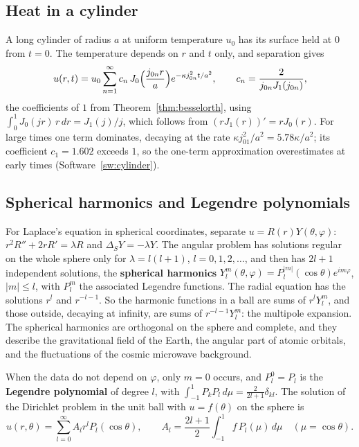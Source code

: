 \documentclass[11pt,a4paper]{article}
\numberwithin{equation}{section}
\theoremstyle{definition}
\begin{document}
\subsection{Heat in a cylinder}
\label{ssec:cylinder}

A long cylinder of radius $a$ at uniform temperature $u_0$ has its surface held at $0$ from $t = 0$. The temperature depends on $r$ and $t$ only, and separation gives
\[
u(r, t) = u_0\sum_{n = 1}^\infty c_n\,J_0\Bigl(\frac{j_{0n}r}a\Bigr)e^{-\kappa j_{0n}^2t/a^2}, \qquad c_n = \frac{2}{j_{0n}J_1(j_{0n})} ,
\]
the coefficients of $1$ from Theorem~\ref{thm:besselorth}, using $\int_0^1J_0(jr)\,r\,dr = J_1(j)/j$, which follows from $(rJ_1(r))' = rJ_0(r)$. For large times one term dominates, decaying at the rate $\kappa j_{01}^2/a^2 = 5.78\kappa/a^2$; its coefficient $c_1 = 1.602$ exceeds $1$, so the one-term approximation overestimates at early
times (Software~\ref{sw:cylinder}).

\subsection{Spherical harmonics and Legendre polynomials}
\label{ssec:spherical}

For Laplace's equation in spherical coordinates, separate $u = R(r)Y(\theta, \varphi)$: $r^2R'' + 2rR' = \lambda R$ and $\Delta_SY = -\lambda Y$. The angular problem has solutions regular on the whole sphere only for $\lambda = l(l + 1)$, $l = 0, 1, 2, \ldots$, and then has $2l + 1$ independent
solutions, the \textbf{spherical harmonics} $Y_l^m(\theta, \varphi) = P_l^{|m|}(\cos\theta)e^{im\varphi}$, $|m| \leq l$, with $P_l^m$ the associated Legendre functions. The radial equation has the solutions $r^l$ and $r^{-l - 1}$. So the harmonic functions in a ball are sums of $r^lY_l^m$, and those outside, decaying at infinity, are sums of
$r^{-l - 1}Y_l^m$: the multipole expansion. The spherical harmonics are orthogonal on the sphere and complete, and they describe the gravitational field of the Earth, the angular part of atomic orbitals, and the fluctuations of the cosmic microwave background.

When the data do not depend on $\varphi$, only $m = 0$ occurs, and $P_l^0 = P_l$ is the \textbf{Legendre polynomial} of degree $l$, with $\int_{-1}^1P_kP_l\,d\mu = \frac{2}{2l + 1}\delta_{kl}$. The solution of the Dirichlet problem in the unit ball with $u = f(\theta)$ on the sphere is
\[
u(r, \theta) = \sum_{l = 0}^\infty A_lr^lP_l(\cos\theta), \qquad A_l = \frac{2l + 1}2\int_{-1}^1f\,P_l(\mu)\,d\mu \quad (\mu = \cos\theta) .
\]
\end{document}
